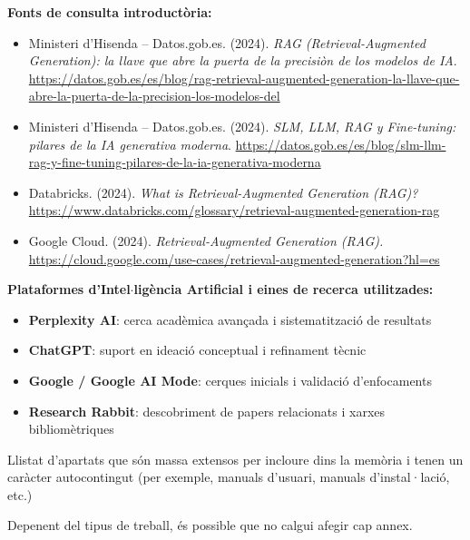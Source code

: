 \documentclass[CAT]{TFUOC}%
\begin{document}
\noindent\textbf{Fonts de consulta introduct\`oria:}
\begin{itemize}
\item Ministeri d'Hisenda -- Datos.gob.es. (2024). \textit{RAG (Retrieval-Augmented Generation): la llave que abre la puerta de la precisi\`on de los modelos de IA}. \url{https://datos.gob.es/es/blog/rag-retrieval-augmented-generation-la-llave-que-abre-la-puerta-de-la-precision-los-modelos-del}

\item Ministeri d'Hisenda -- Datos.gob.es. (2024). \textit{SLM, LLM, RAG y Fine-tuning: pilares de la IA generativa moderna}. \url{https://datos.gob.es/es/blog/slm-llm-rag-y-fine-tuning-pilares-de-la-ia-generativa-moderna}

\item Databricks. (2024). \textit{What is Retrieval-Augmented Generation (RAG)?} \url{https://www.databricks.com/glossary/retrieval-augmented-generation-rag}

\item Google Cloud. (2024). \textit{Retrieval-Augmented Generation (RAG).} \url{https://cloud.google.com/use-cases/retrieval-augmented-generation?hl=es}
\end{itemize}

\vspace{0.5cm}

\noindent\textbf{Plataformes d'Intel$\cdot$ligència Artificial i eines de recerca utilitzades:}
\begin{itemize}
\item \textbf{Perplexity AI}: cerca acadèmica avançada i sistematització de resultats
\item \textbf{ChatGPT}: suport en ideació conceptual i refinament tècnic
\item \textbf{Google / Google AI Mode}: cerques inicials i validació d'enfocaments
\item \textbf{Research Rabbit}: descobriment de papers relacionats i xarxes bibliomètriques
\end{itemize}


\newpage
\appendix
Llistat d’apartats que són massa extensos per incloure dins la memòria i tenen un caràcter autocontingut (per exemple, manuals d’usuari, manuals d’instal·lació, etc.)
 
Depenent del tipus de treball, és possible que no calgui afegir cap annex.
\end{document}
